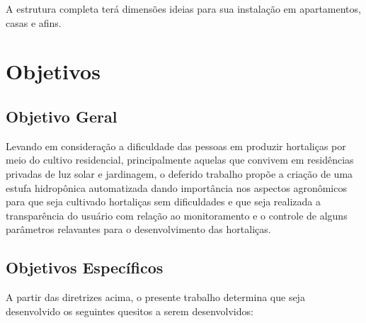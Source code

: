 A estrutura completa terá dimensões ideias para sua instalação em apartamentos, casas e afins.
\section{Objetivos}

\subsection{Objetivo Geral}

Levando em consideração a dificuldade das pessoas em produzir hortaliças por meio do cultivo residencial, principalmente aquelas que convivem em residências privadas de luz solar e jardinagem, o deferido trabalho propõe a criação de uma estufa hidropônica automatizada dando importância nos aspectos agronômicos para que seja cultivado hortaliças sem dificuldades e que seja realizada a transparência do usuário com relação ao monitoramento e o controle de alguns parâmetros relavantes para o desenvolvimento das hortaliças. 

\subsection{Objetivos Específicos}

A partir das diretrizes acima, o presente trabalho determina que seja desenvolvido os seguintes quesitos a serem desenvolvidos:
	
